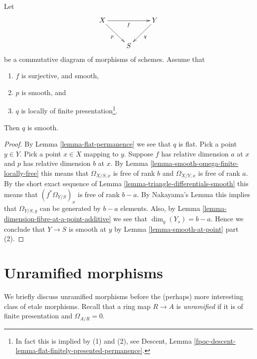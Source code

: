 \begin{lemma}
\label{lemma-smooth-permanence}
Let
$$
\xymatrix{
X \ar[rr]_f \ar[rd]_p & &
Y \ar[dl]^q \\
& S
}
$$
be a commutative diagram of morphisms of schemes. Assume that
\begin{enumerate}
\item $f$ is surjective, and smooth,
\item $p$ is smooth, and
\item $q$ is locally of finite presentation\footnote{In fact this
is implied by (1) and (2), see
Descent, Lemma \ref{fpqc-descent-lemma-flat-finitely-presented-permanence}.}.
\end{enumerate}
Then $q$ is smooth.
\end{lemma}

\begin{proof}
By Lemma \ref{lemma-flat-permanence} we see that $q$ is flat.
Pick a point $y \in Y$. Pick a point $x \in X$ mapping to $y$.
Suppose $f$ has relative dimension $a$ at $x$ and $p$ has relative
dimension $b$ at $x$. By Lemma \ref{lemma-smooth-omega-finite-locally-free}
this means that $\Omega_{X/S, x}$ is free of rank $b$ and $\Omega_{X/Y, x}$
is free of rank $a$. By the short exact sequence
of Lemma \ref{lemma-triangle-differentials-smooth}
this means that $(f^*\Omega_{Y/S})_x$ is free
of rank $b - a$. By Nakayama's Lemma this implies that
$\Omega_{Y/S, y}$ can be generated by $b - a$ elements.
Also, by Lemma \ref{lemma-dimension-fibre-at-a-point-additive} we see that
$\dim_y(Y_s) = b - a$. Hence we conclude that
$Y \to S$ is smooth at $y$ by Lemma \ref{lemma-smooth-at-point} part (2).
\end{proof}
















\section{Unramified morphisms}
\label{section-unramified}

\noindent
We briefly discuss unramified morphisms before the (perhaps) more interesting
class of etale morphisms. Recall that a ring map $R \to A$ is {\it unramified}
if it is of finite presentation and $\Omega_{A/R} = 0$.

